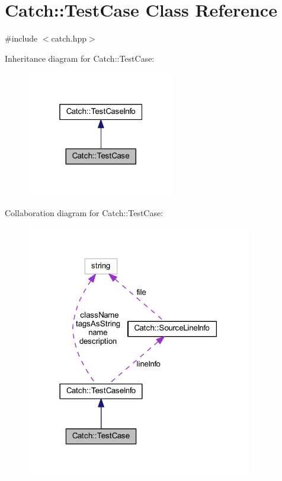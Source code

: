 \hypertarget{class_catch_1_1_test_case}{}\section{Catch\+:\+:Test\+Case Class Reference}
\label{class_catch_1_1_test_case}


{\ttfamily \#include $<$catch.\+hpp$>$}



Inheritance diagram for Catch\+:\+:Test\+Case\+:\nopagebreak
\begin{figure}[H]
\begin{center}
\leavevmode
\includegraphics[width=184pt]{class_catch_1_1_test_case__inherit__graph}
\end{center}
\end{figure}


Collaboration diagram for Catch\+:\+:Test\+Case\+:\nopagebreak
\begin{figure}[H]
\begin{center}
\leavevmode
\includegraphics[width=278pt]{class_catch_1_1_test_case__coll__graph}
\end{center}
\end{figure}

